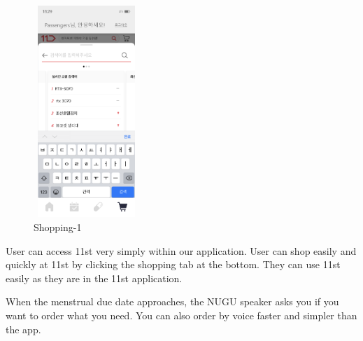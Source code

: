 \documentclass[conference]{IEEEtran}
\begin{document}
\begin{itemize}
    \begin{figure}[ht]
    \includegraphics[width=4cm, height=8cm, center]{sh1.png}
    \caption{Shopping-1}
    \label{fig : Shopping-1}
    \end{figure}
    User can access 11st very simply within our application. User can shop easily and quickly at 11st by clicking the shopping tab at the bottom.
    They can use 11st easily as they are in the 11st application.
    
    When the menstrual due date approaches, the NUGU speaker asks you if you want to order what you need. You can also order by voice faster and simpler than the app.
\end{itemize}
\end{document}
